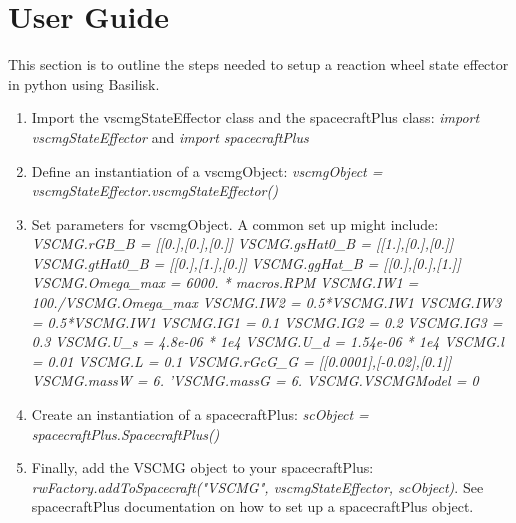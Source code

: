\section{User Guide}

This section is to outline the steps needed to setup a reaction wheel state effector in python using Basilisk.

\begin{enumerate}
	\item Import the vscmgStateEffector class and the spacecraftPlus class: \newline \textit{import vscmgStateEffector} and \textit{import spacecraftPlus}
	\item Define an instantiation of a vscmgObject: \newline
	\textit{vscmgObject = vscmgStateEffector.vscmgStateEffector()}
	\item Set parameters for vscmgObject. A common set up might include: \newline
		\textit{VSCMG.rGB\_B = [[0.],[0.],[0.]]} \newline
         \textit{VSCMG.gsHat0\_B = [[1.],[0.],[0.]]} \newline
         \textit{VSCMG.gtHat0\_B = [[0.],[1.],[0.]]} \newline
         \textit{VSCMG.ggHat\_B = [[0.],[0.],[1.]]} \newline
         \textit{VSCMG.Omega\_max = 6000. * macros.RPM} \newline
         \textit{VSCMG.IW1 = 100./VSCMG.Omega\_max} \newline
         \textit{VSCMG.IW2 = 0.5*VSCMG.IW1} \newline
         \textit{VSCMG.IW3 = 0.5*VSCMG.IW1} \newline
         \textit{VSCMG.IG1 = 0.1} \newline
         \textit{VSCMG.IG2 = 0.2} \newline
         \textit{VSCMG.IG3 = 0.3} \newline
         \textit{VSCMG.U\_s = 4.8e-06 * 1e4} \newline
         \textit{VSCMG.U\_d = 1.54e-06 * 1e4} \newline
         \textit{VSCMG.l = 0.01} \newline
         \textit{VSCMG.L = 0.1} \newline
         \textit{VSCMG.rGcG\_G = [[0.0001],[-0.02],[0.1]]} \newline
         \textit{VSCMG.massW = 6.} \newline
         \textit{'VSCMG.massG = 6.} \newline
         \textit{VSCMG.VSCMGModel = 0} 
	\item Create an instantiation of a spacecraftPlus: \newline
	\textit{scObject = spacecraftPlus.SpacecraftPlus()}
	\item Finally, add the VSCMG object to your spacecraftPlus:\newline
	\textit{rwFactory.addToSpacecraft("VSCMG", vscmgStateEffector, scObject)}. See spacecraftPlus documentation on how to set up a spacecraftPlus object.
\end{enumerate}
